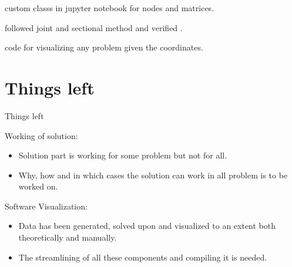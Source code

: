 \documentclass{beamer}
\begin{document}
\begin{frame}
	\begin{exampleblock}{\textbf{}}
		custom classs in jupyter notebook for nodes and matrices.
		
		
	\end{exampleblock}\vspace{20pt}
	
	
	
	\begin{block} {\textbf{}}
		followed joint and sectional method and verified .
	\end{block}\vspace{20pt}
	
	\begin{block}{\textbf{}}
		code for visualizing any problem given the coordinates.
		
	\end{block}
	
\end{frame} 


\section{Things left}
\begin{frame}{Things left}
	
	Working of solution:
	\begin{itemize}
		\item Solution part is working for some problem but not for all.
		\item Why, how and in which cases the solution can work in all problem is to be worked on.
		
	\end{itemize}
	
	Software Visualization:
	\begin{itemize}
		\item Data has been generated, solved upon and visualized to an extent both theoretically and manually.
		\item The streamlining of all these components and compiling it is needed.
		
	\end{itemize}
	
\end{frame}

\end{document}
